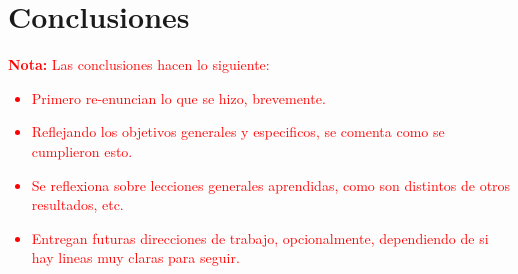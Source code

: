 \chapter{Conclusiones}
\label{c6} %

\textcolor{red}{\textbf{Nota: }Las conclusiones hacen lo siguiente:
\begin{itemize}
    \item Primero re-enuncian lo que se hizo, brevemente.
    \item Reflejando los objetivos generales y especificos, se comenta como se cumplieron esto.
    \item Se reflexiona sobre lecciones generales aprendidas, como son distintos de otros resultados, etc.
    \item Entregan futuras direcciones de trabajo, opcionalmente, dependiendo de si hay lineas muy claras para seguir. 
\end{itemize}}